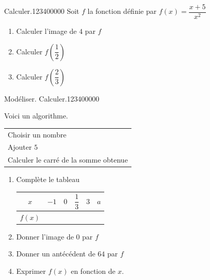 \begin{pageParcoursd} 
 

\begin{ExoCd}{Calculer.}{1234}{0}{0}{0}{0}{0}
 Soit $f$ la fonction définie par $f(x)=\dfrac{x+5}{x^2}$
\begin{enumerate}
\item Calculer l'image de $4$ par $f$ 
\item Calculer $f \left(   \dfrac{1}{2}  \right) $ 
\item Calculer $f \left( \dfrac{2}{3}  \right)$ 
\end{enumerate} 
\end{ExoCd}
 

\begin{ExoCd}{Modéliser. Calculer.}{1234}{0}{0}{0}{0}{0}

Voici un algorithme. 

\begin{tabular}{|l|}
\hline 
Choisir un nombre \\ 
Ajouter $5$ \\ 
Calculer le carré de la somme obtenue \\ 
\hline  
\end{tabular} 

  

\begin{enumerate}
\item Complète le tableau

\begin{tabular}{|c|>{\centering\arraybackslash}p{2cm}|>{\centering\arraybackslash}p{2cm}|>{\centering\arraybackslash}p{2cm}|>{\centering\arraybackslash}p{2cm}|>{\centering\arraybackslash}p{2cm}|}
\hline 
$x$ & $-1$ & $0$ & $\dfrac{1}{3}$ & $3$ & $a$ \\ 
\hline 
$f(x)$ &  &  &   & &   \\ 
\hline 
\end{tabular} 

\vspace{0.2cm}
\item Donner l'image de $0$ par $f$ 
\item Donner un antécédent de $64$ par $f$ 
\item Exprimer $f(x)$ en fonction de $x$. 
\end{enumerate} 
\end{ExoCd}
 

\end{pageParcoursd}
